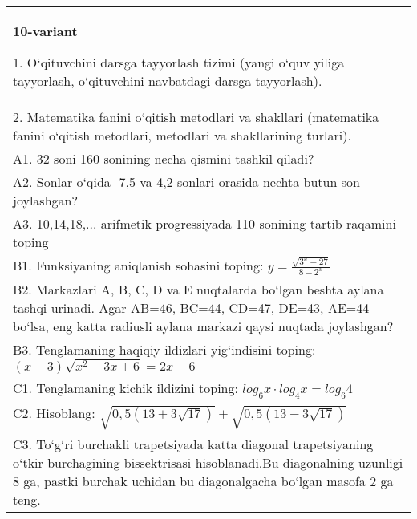\documentclass{article}
\begin{document}
\begin{tabular}{m{17cm}}
\textbf{10-variant}

1. O‘qituvchini darsga tayyorlash tizimi (yangi o‘quv yiliga tayyorlash, o‘qituvchini navbatdagi darsga tayyorlash). \\
2. Matematika fanini o‘qitish metodlari va shakllari (matematika fanini o‘qitish metodlari, metodlari va shakllarining turlari). \\
A1. 32 soni 160 sonining necha qismini tashkil qiladi? \\
A2. Sonlar o‘qida -7,5 va 4,2 sonlari orasida nechta butun son joylashgan? \\
A3. 10,14,18,... arifmetik progressiyada 110 sonining tartib raqamini toping \\
B1. Funksiyaning aniqlanish sohasini toping: \(y = \frac{\sqrt{3^{x} - 27}}{8 - 2^{x}}\) \\
B2. Markazlari A, B, C, D va E nuqtalarda bo‘lgan beshta aylana tashqi urinadi. Agar AB=46, BC=44, CD=47, DE=43, AE=44 bo‘lsa, eng katta radiusli aylana markazi qaysi nuqtada joylashgan? \\
B3. Tenglamaning haqiqiy ildizlari yig‘indisini toping: \((x-3) \sqrt{x^{2} - 3x + 6} = 2x - 6\) \\
C1. Tenglamaning kichik ildizini toping: \(log_{6}x \cdot log_{4}x = log_{6}4\) \\
C2. Hisoblang: \(\sqrt{0,5 (13 + 3\sqrt{17}) } + \sqrt{0,5 (13 - 3\sqrt{17}) }\) \\
C3. To‘g‘ri burchakli trapetsiyada katta diagonal trapetsiyaning o‘tkir burchagining bissektrisasi hisoblanadi.Bu diagonalning uzunligi 8 ga, pastki burchak uchidan bu diagonalgacha bo‘lgan masofa 2 ga teng. \\

\end{tabular}
\vspace{1cm}
\end{document}
